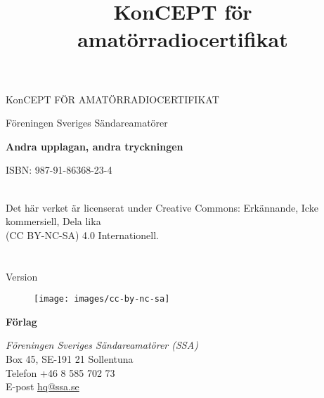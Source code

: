 \onecolumn{}
\vspace{10em}
\title{KonCEPT för amatörradiocertifikat}
\begin{center}
\Large{KonCEPT FÖR AMATÖRRADIOCERTIFIKAT}

Föreningen Sveriges Sändareamatörer\\[2\baselineskip]
\end{center}

\noindent \textbf{Andra upplagan, andra tryckningen}

\noindent ISBN: 987-91-86368-23-4

\noindent
\\
\noindent Det här verket är licenserat under Creative Commons:\newline
\noindent Erkännande, Icke kommersiell, Dela lika\\
\noindent (CC BY-NC-SA) 4.0 Internationell.\\
\\
\\
\noindent Version \revision

\begin{figure}[h]
    \texttt{[image: images/cc-by-nc-sa]}
\end{figure}


\vfill

\noindent
\textbf{Förlag}

\noindent
\textit{Föreningen Sveriges Sändareamatörer (SSA)}\\
Box 45, SE-191 21 Sollentuna\\
Telefon +46 8 585 702 73\\
E-post \href{mailto:hq@ssa.se}{hq@ssa.se}\\[\baselineskip]
\restoregeometry\twocolumn
{}
